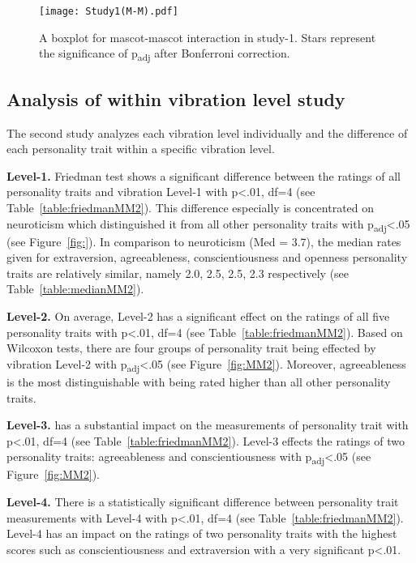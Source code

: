 \begin{figure}[H]
    \centering
    \texttt{[image: Study1(M-M).pdf]}
    \caption[]{A boxplot for mascot-mascot interaction in study-1.
    Stars represent the significance of p\textsubscript{adj} after Bonferroni correction.\footnotemark}
    \label{fig:MM1}
\end{figure}
\subsection{Analysis of within vibration level study}
\label{subsec:MMstudy2}
The second study analyzes each vibration level individually and the difference
of each personality trait within a specific vibration level.

\par\textbf{Level-1.}
Friedman test shows a significant difference between the ratings of all personality traits
and vibration Level-1 with p<.01, df=4 (see Table~\ref{table:friedmanMM2}).
This difference especially is concentrated on neuroticism which distinguished it from all
other personality traits with p\textsubscript{adj}<.05 (see Figure~\ref{fig:}).
In comparison to neuroticism (Med = 3.7), the median rates given for extraversion,
agreeableness, conscientiousness and openness personality traits are relatively similar,
namely 2.0, 2.5, 2.5, 2.3 respectively (see Table~\ref{table:medianMM2}).

\par\textbf{Level-2.}
On average, Level-2 has a significant effect on the ratings of all five personality
traits with p<.01, df=4 (see Table~\ref{table:friedmanMM2}).
Based on Wilcoxon tests, there are four groups of personality trait being effected by
vibration Level-2 with p\textsubscript{adj}<.05 (see Figure~\ref{fig:MM2}).
Moreover, agreeableness is the most distinguishable with being rated higher
than all other personality traits.

\par\textbf{Level-3.}
has a substantial impact on the measurements of personality trait
with p<.01, df=4 (see Table~\ref{table:friedmanMM2}).
Level-3 effects the ratings of two personality traits: agreeableness and
conscientiousness with p\textsubscript{adj}<.05 (see Figure~\ref{fig:MM2}).

\par\textbf{Level-4.}
There is a statistically significant difference between personality trait measurements
with Level-4 with p<.01, df=4 (see Table~\ref{table:friedmanMM2}).
Level-4 has an impact on the ratings of two personality traits with the highest scores
such as conscientiousness and extraversion
with a very significant p<.01.

